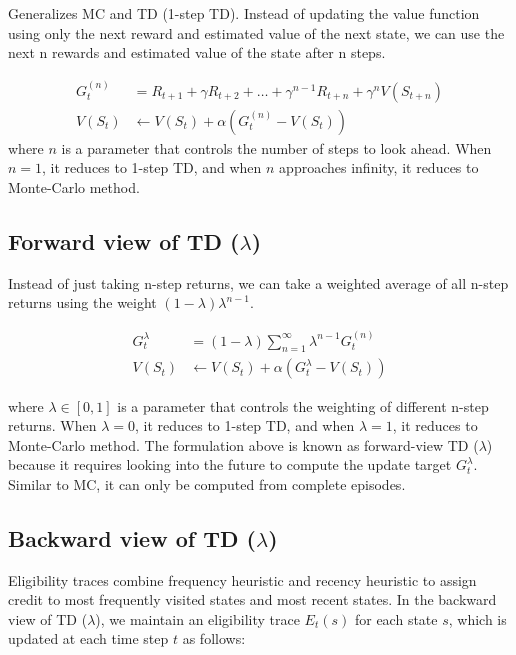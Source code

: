 Generalizes MC and TD (1-step TD). Instead of updating the value function using
only the next reward and estimated value of the next state, we can use the next
n rewards and estimated value of the state after n steps.

\begin{align*}
    G_t^{(n)} & = R_{t+1} + \gamma R_{t+2} + \ldots + \gamma^{n-1} R_{t+n} + \gamma^n V(S_{t+n}) \\
    V(S_t)    & \leftarrow V(S_t) + \alpha (G_t^{(n)} - V(S_t))
\end{align*}
where $n$ is a parameter that controls the number of steps to look ahead. When $n = 1$, it
reduces to 1-step TD, and when $n$ approaches infinity, it reduces to Monte-Carlo method.

\subsection{Forward view of TD ($\lambda$)}

Instead of just taking n-step returns, we can take a weighted average of all
n-step returns using the weight $(1 - \lambda) \lambda^{n-1}$.

\begin{align*}
    G_t^{\lambda} & = (1 - \lambda) \sum_{n=1}^{\infty} \lambda^{n-1} G_t^{(n)} \\
    V(S_t)        & \leftarrow V(S_t) + \alpha (G_t^{\lambda} - V(S_t))
\end{align*}

\noindent where $\lambda \in [0, 1]$ is a parameter that controls the weighting of
different n-step returns. When $\lambda = 0$, it reduces to 1-step TD, and when
$\lambda = 1$, it reduces to Monte-Carlo method. The formulation above is known
as forward-view TD ($\lambda$) because it requires looking into the future to
compute the update target $G_t^{\lambda}$. Similar to MC, it can only be
computed from complete episodes.

\subsection{Backward view of TD ($\lambda$)}

Eligibility traces combine frequency heuristic and recency heuristic to assign
credit to most frequently visited states and most recent states. In the
backward view of TD ($\lambda$), we maintain an eligibility trace $E_t(s)$ for
each state $s$, which is updated at each time step $t$ as follows:

